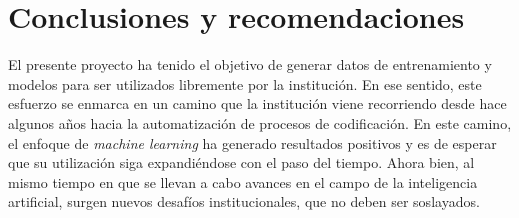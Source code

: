 \documentclass[
  12pt,
  spanish,
]{article}
\begin{document}
\newpage

\hypertarget{conclusiones-y-recomendaciones}{%
\section{Conclusiones y
recomendaciones}\label{conclusiones-y-recomendaciones}}

El presente proyecto ha tenido el objetivo de generar datos de
entrenamiento y modelos para ser utilizados libremente por la
institución. En ese sentido, este esfuerzo se enmarca en un camino que
la institución viene recorriendo desde hace algunos años hacia la
automatización de procesos de codificación. En este camino, el enfoque
de \emph{machine learning} ha generado resultados positivos y es de
esperar que su utilización siga expandiéndose con el paso del tiempo.
Ahora bien, al mismo tiempo en que se llevan a cabo avances en el campo
de la inteligencia artificial, surgen nuevos desafíos institucionales,
que no deben ser soslayados.
\end{document}
